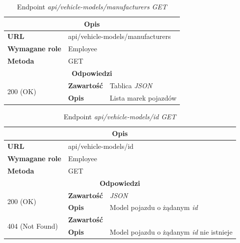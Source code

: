 \documentclass[eng,printmode,openany]{mgr}
\begin{document}
	\begin{table}[H]
		\caption{Endpoint \textit{api/vehicle-models/manufacturers GET}}
		\begin{tabularx}{\textwidth}{|l|l|X|}
			\hline
			\multicolumn{3}{|c|}{\textbf{\textbf{Opis}}}
			
			\\ \hline
			\textbf{URL}                         & \multicolumn{2}{l|}{api/vehicle-models/manufacturers}
			\\ \hline
			\textbf{Wymagane role}               & \multicolumn{2}{l|}{Employee}
			\\ \hline
			\textbf{Metoda}                      & \multicolumn{2}{l|}{GET}
			\\ \hline
			\multicolumn{3}{|c|}{\textbf{Odpowiedzi}}
			\\ \hline
			\multirow{2}{*}{200 (OK)}   & \textbf{Zawartość}        & Tablica \textit{JSON}
			\\ \cline{2-3}              & \textbf{Opis}         	   & Lista marek pojazdów
			\\ \hline
		\end{tabularx}
	\end{table}
	
	\begin{table}[H]
		\caption{Endpoint \textit{api/vehicle-models/id GET}}
		\begin{tabularx}{\textwidth}{|l|l|X|}
			\hline
			\multicolumn{3}{|c|}{\textbf{\textbf{Opis}}}
			\\ \hline
			\textbf{URL}                         & \multicolumn{2}{l|}{api/vehicle-models/id}
			\\ \hline
			\textbf{Wymagane role}               & \multicolumn{2}{l|}{Employee}
			\\ \hline
			\textbf{Metoda}                      & \multicolumn{2}{l|}{GET}
			\\ \hline
			\multicolumn{3}{|c|}{\textbf{Odpowiedzi}}
			\\ \hline
			\multirow{2}{*}{200 (OK)} 	        & \textbf{Zawartość}   	& \textit{JSON}
			\\ \cline{2-3}                      & \textbf{Opis}         	& Model pojazdu o żądanym \textit{id}
			\\ \hline
			\multirow{2}{*}{404 (Not Found)} 	& \textbf{Zawartość}     & 
			\\ \cline{2-3}                      & \textbf{Opis}          & Model pojazdu o żądanym \textit{id} nie istnieje
			\\ \hline
		\end{tabularx}
	\end{table}
	
\end{document}
